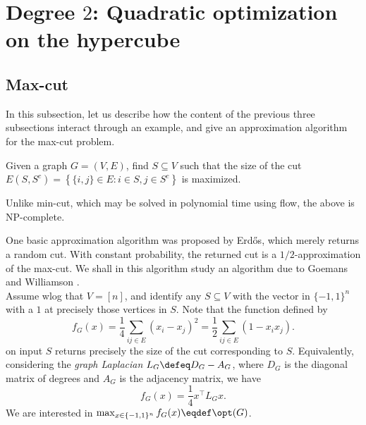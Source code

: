 
\section{Degree $2$: Quadratic optimization on the hypercube}
\label{sec:quad-optim}

\subsection{Max-cut}
\label{subsec:max-cut}

	In this subsection, let us describe how the content of the previous three subsections interact through an example, and give an approximation algorithm for the max-cut problem.

	\begin{question*}
		Given a graph $G = (V,E)$, find $S \subseteq V$ such that the size of the cut $E(S,S^c) = \left\{ \{i,j\} \in E : i \in S, j \in S^c \right\}$ is maximized.
	\end{question*}

	Unlike min-cut, which may be solved in polynomial time using flow, the above is \textsf{NP}-complete.

	One basic approximation algorithm was proposed by Erd\H{o}s, which merely returns a random cut. With constant probability, the returned cut is a $1/2$-approximation of the max-cut. We shall in this algorithm study an algorithm due to Goemans and Williamson \cite{gw-maxcut}.\\
	Assume wlog that $V = [n]$, and identify any $S \subseteq V$ with the vector in $\{-1,1\}^n$ with a $1$ at precisely those vertices in $S$. Note that the function defined by
	\begin{equation}
		\label{eqn: fg-def}
		f_G(x) = \frac{1}{4} \sum_{ij \in E} (x_i - x_j)^2 = \frac{1}{2} \sum_{ij \in E} (1 - x_ix_j).
	\end{equation}
	on input $S$ returns precisely the size of the cut corresponding to $S$. Equivalently, considering the \emph{graph Laplacian} $L_G \defeq D_G - A_G$, where $D_G$ is the diagonal matrix of degrees and $A_G$ is the adjacency matrix, we have
	\begin{equation}
		\label{eqn: gw-lapl}
		f_G(x) = \frac{1}{4} x^\top L_G x.
	\end{equation}
	We are interested in $\max_{x \in \{-1,1\}^n} f_G(x) \eqdef \opt(G)$.

